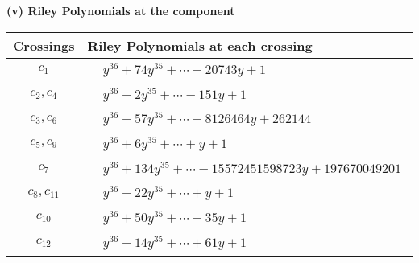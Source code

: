 \documentclass[1p]{elsarticle_modified}
\theoremstyle{definition}
\begin{document}
\newpage\renewcommand{\arraystretch}{1}
\flushleft \textbf{(v) Riley Polynomials at the component}\newline \\
\begin{tabular}{m{50pt}|m{274pt}}
Crossings & \hspace{64pt}Riley Polynomials at each crossing \\
\hline $$\begin{aligned}c_{1}\end{aligned}$$&$\begin{aligned}
&y^{36}+74 y^{35}+\cdots-20743 y+1
\end{aligned}$\\
\hline $$\begin{aligned}c_{2},c_{4}\end{aligned}$$&$\begin{aligned}
&y^{36}-2 y^{35}+\cdots-151 y+1
\end{aligned}$\\
\hline $$\begin{aligned}c_{3},c_{6}\end{aligned}$$&$\begin{aligned}
&y^{36}-57 y^{35}+\cdots-8126464 y+262144
\end{aligned}$\\
\hline $$\begin{aligned}c_{5},c_{9}\end{aligned}$$&$\begin{aligned}
&y^{36}+6 y^{35}+\cdots+y+1
\end{aligned}$\\
\hline $$\begin{aligned}c_{7}\end{aligned}$$&$\begin{aligned}
&y^{36}+134 y^{35}+\cdots-15572451598723 y+197670049201
\end{aligned}$\\
\hline $$\begin{aligned}c_{8},c_{11}\end{aligned}$$&$\begin{aligned}
&y^{36}-22 y^{35}+\cdots+y+1
\end{aligned}$\\
\hline $$\begin{aligned}c_{10}\end{aligned}$$&$\begin{aligned}
&y^{36}+50 y^{35}+\cdots-35 y+1
\end{aligned}$\\
\hline $$\begin{aligned}c_{12}\end{aligned}$$&$\begin{aligned}
&y^{36}-14 y^{35}+\cdots+61 y+1
\end{aligned}$\\
\hline
\end{tabular}\\~\\
\end{document}
